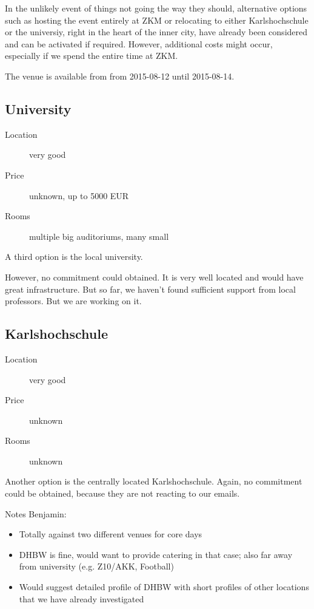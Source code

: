 In the unlikely event of things not going the way they should, 
alternative options such as hosting the event entirely at ZKM or 
relocating to either Karlshochschule or the universiy,
right in the heart of the inner city, have already been considered and can be activated if required.
However, additional costs might occur, especially if we spend the
entire time at ZKM.


The venue is available from from 2015-08-12 until 2015-08-14.


\subsection{University}
\begin{description}
\item[Location] very good
\item[Price] unknown, up to 5000 EUR
\item[Rooms] multiple big auditoriums, many small
\end{description}

A third option is the local university.

However, no commitment could obtained.
It is very well located and would have great infrastructure.
But so far, we haven't found sufficient support from local professors.
But we are working on it.


\subsection{Karlshochschule}
\begin{description}
\item[Location] very good
\item[Price] unknown
\item[Rooms] unknown
\end{description}

Another option is the centrally located Karlshochschule.
Again, no commitment could be obtained, because they are not reacting
to our emails.

Notes Benjamin:
\begin{itemize}
 \item Totally against two different venues for core days
 \item DHBW is fine, would want to provide catering in that case; also far away from university (e.g. Z10/AKK, Football)
 \item Would suggest detailed profile of DHBW with short profiles of other locations that we have already investigated
\end{itemize}
